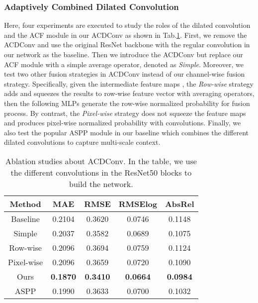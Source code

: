 \documentclass[letterpaper]{article} \usepackage{aaai21}  \usepackage{times}  \usepackage{helvet} \usepackage{courier}  \usepackage[hyphens]{url}  \usepackage{graphicx} \urlstyle{rm} \def\UrlFont{\rm}  \usepackage{natbib}  \usepackage{caption} \frenchspacing  \setlength{\pdfpagewidth}{8.5in}  \setlength{\pdfpageheight}{11in}
\newcommand{\newchange}[1]{{\color{black}#1}}
\begin{document}
\subsubsection{Adaptively Combined Dilated Convolution}
Here, four experiments are executed to study the roles of the dilated convolution and the ACF module in our ACDConv as shown in Tab.\ref{tab:abs-1}. 
First, we remove the ACDConv and use the original ResNet backbone with the regular convolution in our network as the baseline. Then we introduce the ACDConv but replace our ACF module with a simple average operator, denoted as \textit{Simple}.
\newchange{
Moreover, we test two other fusion strategies in ACDConv instead of our channel-wise fusion strategy. Specifically, given the intermediate feature maps , the \textit{Row-wise} strategy adds  and squeezes the results to row-wise feature vector  with averaging operators, then the following MLPs generate the row-wise normalized probability  for fusion process. By contrast, the \textit{Pixel-wise} strategy does not squeeze the feature maps and produces pixel-wise normalized probability  with  convolutions.
}
Finally, we also test the popular ASPP module in our baseline which combines the different dilated convolutions to capture multi-scale context. 

\begin{table}[tb]
    \centering
\begin{tabular}{ccccc} 
\toprule 
Method & MAE & RMSE & RMSElog &  AbsRel \\
\midrule 
Baseline  & 0.2104 & 0.3620 & 0.0746 & 0.1148 \\
Simple & 0.2037 & 0.3582 & 0.0689 & 0.1075 \\
Row-wise & 0.2096 & 0.3694 & 0.0759 & 0.1124 \\
Pixel-wise & 0.2096 & 0.3659 & 0.0720 & 0.1090 \\
Ours   & \textbf{0.1870} & \textbf{0.3410} & \textbf{0.0664} & \textbf{0.0984} \\
ASPP & 0.1990 & 0.3633 & 0.0700 & 0.1032 \\
\bottomrule
    \end{tabular}
    \caption{Ablation studies about ACDConv. In the table, we use the different convolutions in the ResNet50 blocks to build the network.}
    \label{tab:abs-1}
\end{table}
\end{document}
